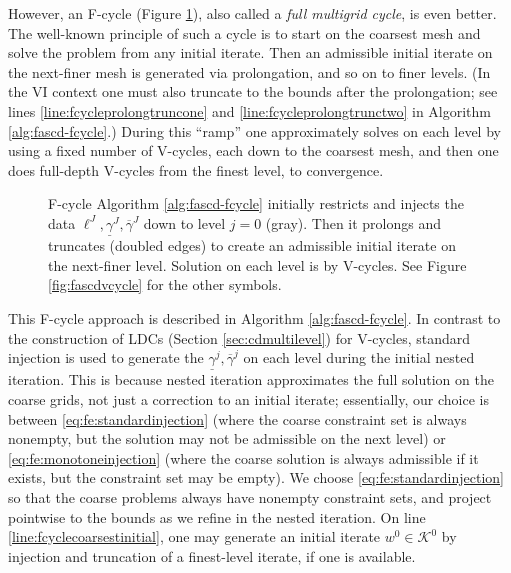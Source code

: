 \documentclass[letterpaper,final,12pt,reqno]{amsart}
\theoremstyle{cstyle}
\theoremstyle{cstyle*}
\theoremstyle{dstyle}
\numberwithin{equation}{section}
\numberwithin{figure}{section}
\numberwithin{table}{section}
\numberwithin{theorem}{section}
\begin{document}
However, an F-cycle (Figure \ref{fig:fcycle}), also called a \emph{full multigrid cycle}, is even better.  The well-known principle of such a cycle \cite[section 2.6]{Trottenbergetal2001} is to start on the coarsest mesh and solve the problem from any initial iterate.  Then an admissible initial iterate on the next-finer mesh is generated via prolongation, and so on to finer levels.  (In the VI context one must also truncate to the bounds after the prolongation; see lines \ref{line:fcycleprolongtruncone} and \ref{line:fcycleprolongtrunctwo} in Algorithm \ref{alg:fascd-fcycle}.)  During this ``ramp'' one approximately solves on each level by using a fixed number of V-cycles, each down to the coarsest mesh, and then one does full-depth V-cycles from the finest level, to convergence.

\begin{figure}[h]
\begin{center}

\end{center}
\caption{F-cycle Algorithm \ref{alg:fascd-fcycle} initially restricts and injects the data $\ell^J,\underline{\gamma}^J,\overline{\gamma}^J$ down to level $j=0$ (gray).  Then it prolongs and truncates (doubled edges) to create an admissible initial iterate on the next-finer level.  Solution on each level is by V-cycles. See Figure \ref{fig:fascdvcycle} for the other symbols.}
\label{fig:fcycle}
\end{figure}

This F-cycle approach is described in Algorithm \ref{alg:fascd-fcycle}.  In contrast to the construction of LDCs (Section \ref{sec:cdmultilevel}) for V-cycles, standard injection is used to generate the $\underline{\gamma}^j,\overline{\gamma}^j$ on each level during the initial nested iteration. This is because nested iteration approximates the full solution on the coarse grids, not just a correction to an initial iterate; essentially, our choice is between \eqref{eq:fe:standardinjection} (where the coarse constraint set is always nonempty, but the solution may not be admissible on the next level) or \eqref{eq:fe:monotoneinjection} (where the coarse solution is always admissible if it exists, but the constraint set may be empty). We choose \eqref{eq:fe:standardinjection} so that the coarse problems always have nonempty constraint sets, and project pointwise to the bounds as we refine in the nested iteration.
On line \ref{line:fcyclecoarsestinitial}, one may generate an initial iterate $w^0\in\mathcal{K}^0$ by injection and truncation of a finest-level iterate, if one is available.
\end{document}
